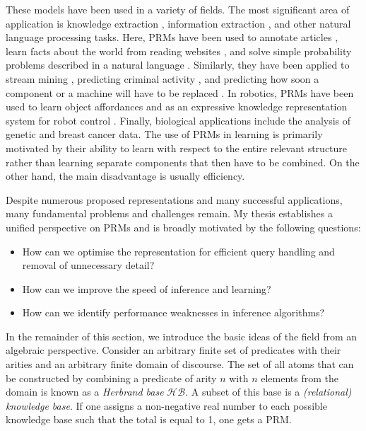 \documentclass{article}
\begin{document}
These models have been used in a variety of fields. The most significant area of
application is knowledge extraction \cite{DBLP:conf/naacl/PoonV10}, information
extraction \cite{bunescu2007statistical}, and other natural language processing
tasks. Here, PRMs have been used to annotate articles
\cite{DBLP:conf/emnlp/VerbekeAMFDR12}, learn facts about the world from reading
websites \cite{DBLP:conf/aaai/CarlsonBKSHM10}, and solve simple probability
problems described in a natural language \cite{DBLP:conf/ijcai/DriesKDBR17}.
Similarly, they have been applied to stream mining
\cite{DBLP:conf/icdm/ChandraSKTA14}, predicting criminal activity
\cite{DBLP:conf/sdm/DelaneyFCWJ10}, and predicting how soon a component or a
machine will have to be replaced \cite{vlasselaer2012statistical}. In robotics,
PRMs have been used to learn object affordances
\cite{DBLP:conf/iros/MoldovanR14,DBLP:conf/icra/MoldovanMOSR12,DBLP:conf/ilp/MoldovanORMS11}
and as an expressive knowledge representation system for robot control
\cite{DBLP:conf/icra/JainMB09}. Finally, biological applications include the
analysis of genetic \cite{DBLP:journals/jcb/SakhanenkoG12} and breast cancer
\cite{DBLP:conf/ilp/Corte-RealD017,DBLP:conf/pkdd/NassifKBPSC13} data. The use
of PRMs in learning is primarily motivated by their ability to learn with
respect to the entire relevant structure rather than learning separate
components that then have to be combined. On the other hand, the main
disadvantage is usually efficiency.

Despite numerous proposed representations and many successful applications,
many fundamental problems and challenges remain. My thesis establishes a
unified perspective on PRMs and is broadly motivated by the following questions:
\begin{itemize}
\item How can we optimise the representation for efficient query handling and
  removal of unnecessary detail?
\item How can we improve the speed of inference and learning?
\item How can we identify performance weaknesses in inference algorithms?
\end{itemize}

In the remainder of this section, we introduce the basic ideas of the field from
an algebraic perspective. Consider an arbitrary finite set of predicates with
their arities and an arbitrary finite domain of discourse. The set of all atoms
that can be constructed by combining a predicate of arity $n$ with $n$ elements
from the domain is known as a \emph{Herbrand base} $\mathcal{HB}$. A subset of
this base is a \emph{(relational) knowledge base}. If one assigns a non-negative
real number to each possible knowledge base such that the total is equal to 1,
one gets a PRM.
\end{document}

